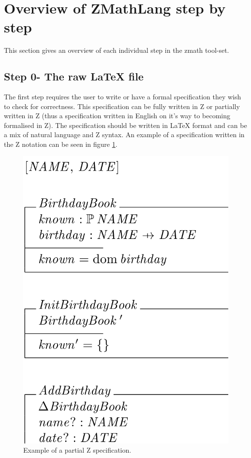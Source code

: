 \section{Overview of ZMathLang step by step}

This section gives an overview of each individual step in the \gls{zmath}
tool-set.

\subsection{Step 0- The raw LaTeX file}

The first step requires the user to write or have a formal specification they
wish to check for correctness. This specification can be fully written in Z or
partially written in Z (thus a specification written in English on it's way to
becoming formalised in Z). The specification should be written in \LaTeX{}
format and can be a mix of natural language and Z syntax. An example of a
specification written in the Z notation can be seen in figure
\ref{fig:zexample}.

\begin{figure}[H]
 \begin{center}
 \includegraphics[scale=0.25]{Figures/Design/zspec.png}
 \caption{Example of a partial Z specification.}
 \label{fig:zexample}
\end{center}
\end{figure} 

